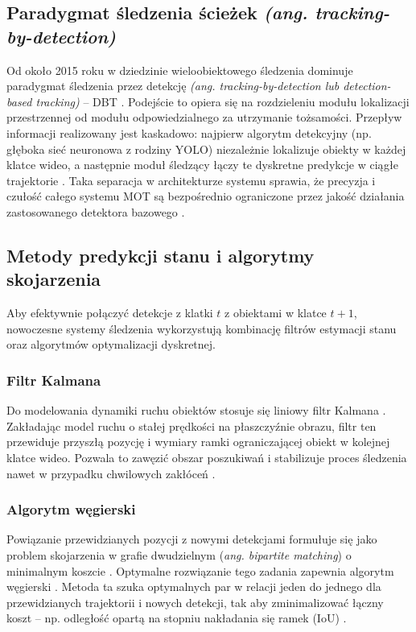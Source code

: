 \subsection{Paradygmat śledzenia ścieżek \textit{(ang. tracking-by-detection)}}
Od około 2015 roku w dziedzinie wieloobiektowego śledzenia dominuje paradygmat śledzenia przez detekcję \textit{(ang. tracking-by-detection lub detection-based tracking)} – DBT \cite{wojke2017}. Podejście to opiera się na rozdzieleniu modułu lokalizacji przestrzennej od modułu odpowiedzialnego za utrzymanie tożsamości. Przepływ informacji realizowany jest kaskadowo: najpierw algorytm detekcyjny (np. głęboka sieć neuronowa z rodziny YOLO) niezależnie lokalizuje obiekty w każdej klatce wideo, a następnie moduł śledzący łączy te dyskretne predykcje w ciągłe trajektorie \cite{bewley2016, wojke2017}. Taka separacja w architekturze systemu sprawia, że precyzja i czułość całego systemu MOT są bezpośrednio ograniczone przez jakość działania zastosowanego detektora bazowego \cite{bewley2016}.

\subsection{Metody predykcji stanu i algorytmy skojarzenia}
Aby efektywnie połączyć detekcje z klatki $t$ z obiektami w klatce $t+1$, nowoczesne systemy
śledzenia wykorzystują kombinację filtrów estymacji stanu oraz algorytmów optymalizacji dyskretnej.

\subsubsection{Filtr Kalmana}
Do modelowania dynamiki ruchu obiektów stosuje się liniowy filtr Kalmana \cite{kalman1960,
  bewley2016}. Zakładając model ruchu o stałej prędkości na płaszczyźnie obrazu, filtr ten przewiduje
przyszłą pozycję i wymiary ramki ograniczającej obiekt w kolejnej klatce wideo. Pozwala to zawęzić
obszar poszukiwań i stabilizuje proces śledzenia nawet w przypadku chwilowych zakłóceń
\cite{bewley2016}.

\subsubsection{Algorytm węgierski}
Powiązanie przewidzianych pozycji z nowymi detekcjami formułuje się jako problem skojarzenia w
grafie dwudzielnym (\textit{ang. bipartite matching}) o minimalnym koszcie \cite{bewley2016}.
Optymalne rozwiązanie tego zadania zapewnia algorytm węgierski \cite{kuhn1955, bewley2016}. Metoda
ta szuka optymalnych par w relacji jeden do jednego dla przewidzianych trajektorii i nowych
detekcji, tak aby zminimalizować łączny koszt – np. odległość opartą na stopniu nakładania się
ramek (IoU) \cite{kuhn1955, bewley2016}.


